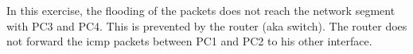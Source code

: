 In this exercise, the flooding of the packets does not reach the network segment with PC3 and PC4. This is prevented by the router (aka switch). The router does not forward the icmp packets between PC1 and PC2 to his other interface.

